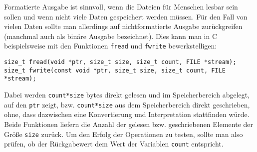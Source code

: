 Formatierte Ausgabe ist sinnvoll, wenn die Dateien für Menschen lesbar sein sollen und wenn nicht viele Daten gespeichert werden müssen.
Für den Fall von vielen Daten sollte man allerdings auf nichtformatierte Ausgabe zurückgreifen (manchmal auch als binäre Ausgabe bezeichnet).
Dies kann man in C beispielsweise mit den Funktionen \texttt{fread} und \texttt{fwrite} bewerkstelligen:
\begin{lstlisting}
size_t fread(void *ptr, size_t size, size_t count, FILE *stream);
size_t fwrite(const void *ptr, size_t size, size_t count, FILE *stream);
\end{lstlisting}
Dabei werden \verb|count*size| bytes direkt gelesen und im Speicherbereich abgelegt, auf den \verb|ptr| zeigt, bzw. \verb|count*size| aus dem Speicherbereich direkt geschrieben, ohne, dass dazwischen eine Konvertierung und Interpretation stattfinden würde.
Beide Funktionen liefern die Anzahl der gelesen bzw. geschriebenen Elemente der Größe \verb|size| zurück.
Um den Erfolg der Operationen zu testen, sollte man also prüfen, ob der Rückgabewert dem Wert der Variablen \verb|count| entspricht.

